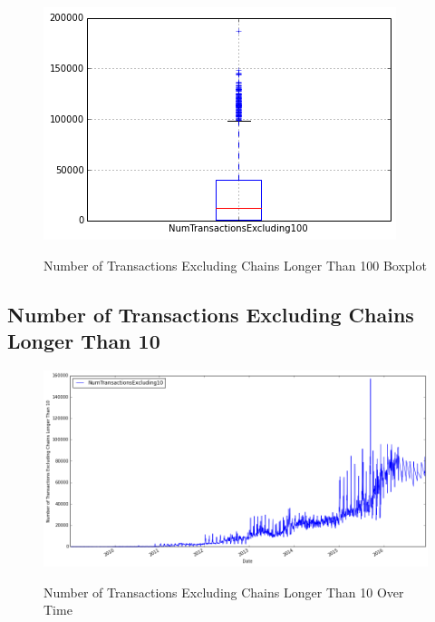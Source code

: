 \begin{figure}[bth]
  \myfloatalign
  {\includegraphics[width=1\linewidth]
    {gfx/n-transactions-excluding-chains-longer-than-100-boxplot}}
  \caption{Number of Transactions Excluding Chains Longer Than 100
    Boxplot}
  \label{fig:n-transactions-excluding-chains-longer-than-100-boxplot}
\end{figure}

\clearpage

\subsection{Number of Transactions Excluding Chains Longer Than 10}
\label{sec:n-transactions-excluding-chains-longer-than-10}

\begin{figure}[bth]
  \myfloatalign
  {\includegraphics[width=1\linewidth]
    {gfx/n-transactions-excluding-chains-longer-than-10-over-time}}
  \caption{Number of Transactions Excluding Chains Longer Than 10
    Over Time}
  \label{fig:n-transactions-excluding-chains-longer-than-10-over-time}
\end{figure}

